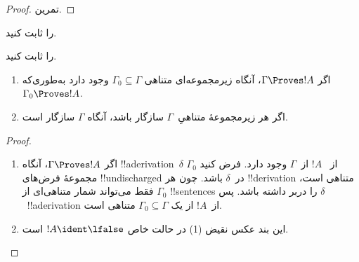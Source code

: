 \documentclass[../../../include/open-logic-section]{subfiles}
\begin{document}
\begin{proof}
تمرین.
\end{proof}

\begin{prob}
 را ثابت کنید.
\end{prob}
\tagendprob

\begin{prob}
 را ثابت کنید.
\end{prob}
\tagendprob

\begin{prop}[فشردگی]
  \begin{enumerate}
  \item اگر $\Gamma \Proves !A$، آنگاه زیرمجموعه‌ای متناهی
    $\Gamma_0 \subseteq \Gamma$ وجود دارد به‌طوری‌که
    $\Gamma_0 \Proves !A$.
  \item اگر هر زیرمجموعهٔ متناهیِ~$\Gamma$ سازگار باشد، آنگاه
    $\Gamma$ سازگار است.
  \end{enumerate}
\end{prop}

\begin{proof}
  \begin{enumerate}
    \item اگر $\Gamma \Proves !A$، آنگاه !!a{derivation}~$\delta$ از
      ~$!A$ از~$\Gamma$ وجود دارد. فرض کنید $\Gamma_0$ مجموعهٔ فرض‌های
      !!{undischarged} در~$\delta$ باشد. چون هر !!{derivation} متناهی
      است، $\Gamma_0$ فقط می‌تواند شمار متناهی‌ای از !!{sentence}s را
      دربر داشته باشد. پس $\delta$~!!a{derivation} از~$!A$ از یک
      $\Gamma_0 \subseteq \Gamma$ متناهی است.
    \item این بند عکس نقیض (1) در حالت خاص $!A
      \ident \lfalse$ است.
  \end{enumerate}
\end{proof}
\end{document}
